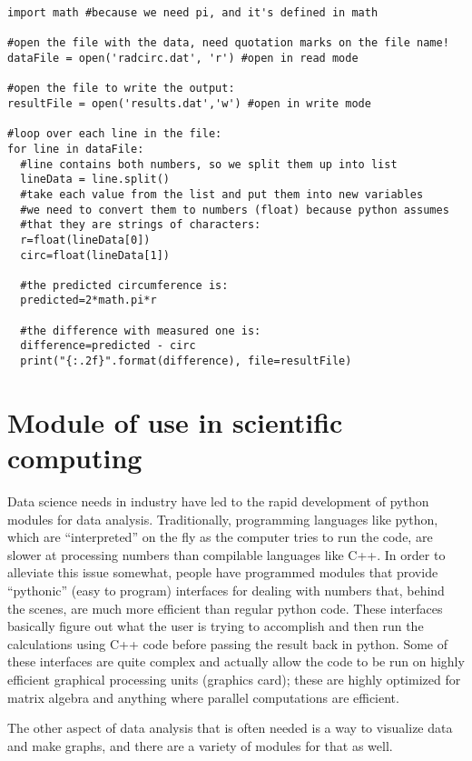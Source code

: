 \begin{lstlisting}[frame=single] 
import math #because we need pi, and it's defined in math

#open the file with the data, need quotation marks on the file name!
dataFile = open('radcirc.dat', 'r') #open in read mode

#open the file to write the output:
resultFile = open('results.dat','w') #open in write mode

#loop over each line in the file:
for line in dataFile:
  #line contains both numbers, so we split them up into list
  lineData = line.split()
  #take each value from the list and put them into new variables
  #we need to convert them to numbers (float) because python assumes
  #that they are strings of characters:
  r=float(lineData[0])
  circ=float(lineData[1])
  
  #the predicted circumference is:
  predicted=2*math.pi*r
  
  #the difference with measured one is:
  difference=predicted - circ
  print("{:.2f}".format(difference), file=resultFile)

\end{lstlisting}


\section{Module of use in scientific computing}

Data science needs in industry have led to the rapid development of python modules for data analysis. Traditionally, programming languages like python, which are ``interpreted'' on the fly as the computer tries to run the code, are slower at processing numbers than compilable languages like C++. In order to alleviate this issue somewhat, people have programmed modules that provide ``pythonic'' (easy to program) interfaces for dealing with numbers that, behind the scenes, are much more efficient than regular python code. These interfaces basically figure out what the user is trying to accomplish and then run the calculations using C++ code before passing the result back in python. Some of these interfaces are quite complex and actually allow the code to be run on highly efficient graphical processing units (graphics card); these are highly optimized for matrix algebra and anything where parallel computations are efficient.

The other aspect of data analysis that is often needed is a way to visualize data and make graphs, and there are a variety of modules for that as well. 

